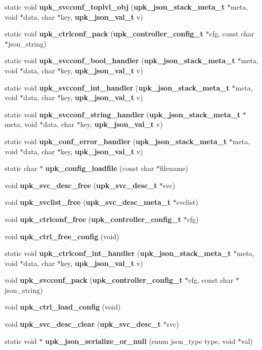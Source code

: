 \begin{DoxyCompactItemize}
\item 
static void {\bf upk\_\-svcconf\_\-toplvl\_\-obj} ({\bf upk\_\-json\_\-stack\_\-meta\_\-t} $\ast$meta, void $\ast$data, char $\ast$key, {\bf upk\_\-json\_\-val\_\-t} v)
\item 
static void {\bf upk\_\-ctrlconf\_\-pack} ({\bf upk\_\-controller\_\-config\_\-t} $\ast$cfg, const char $\ast$json\_\-string)
\item 
static void {\bf upk\_\-svcconf\_\-bool\_\-handler} ({\bf upk\_\-json\_\-stack\_\-meta\_\-t} $\ast$meta, void $\ast$data, char $\ast$key, {\bf upk\_\-json\_\-val\_\-t} v)
\item 
static void {\bf upk\_\-svcconf\_\-int\_\-handler} ({\bf upk\_\-json\_\-stack\_\-meta\_\-t} $\ast$meta, void $\ast$data, char $\ast$key, {\bf upk\_\-json\_\-val\_\-t} v)
\item 
static void {\bf upk\_\-svcconf\_\-string\_\-handler} ({\bf upk\_\-json\_\-stack\_\-meta\_\-t} $\ast$meta, void $\ast$data, char $\ast$key, {\bf upk\_\-json\_\-val\_\-t} v)
\item 
static void {\bf upk\_\-conf\_\-error\_\-handler} ({\bf upk\_\-json\_\-stack\_\-meta\_\-t} $\ast$meta, void $\ast$data, char $\ast$key, {\bf upk\_\-json\_\-val\_\-t} v)
\item 
static char $\ast$ {\bf upk\_\-config\_\-loadfile} (const char $\ast$filename)
\item 
void {\bf upk\_\-svc\_\-desc\_\-free} ({\bf upk\_\-svc\_\-desc\_\-t} $\ast$svc)
\item 
void {\bf upk\_\-svclist\_\-free} ({\bf upk\_\-svc\_\-desc\_\-meta\_\-t} $\ast$svclist)
\item 
void {\bf upk\_\-ctrlconf\_\-free} ({\bf upk\_\-controller\_\-config\_\-t} $\ast$cfg)
\item 
void {\bf upk\_\-ctrl\_\-free\_\-config} (void)
\item 
static void {\bf upk\_\-ctrlconf\_\-int\_\-handler} ({\bf upk\_\-json\_\-stack\_\-meta\_\-t} $\ast$meta, void $\ast$data, char $\ast$key, {\bf upk\_\-json\_\-val\_\-t} v)
\item 
void {\bf upk\_\-svcconf\_\-pack} ({\bf upk\_\-controller\_\-config\_\-t} $\ast$cfg, const char $\ast$json\_\-string)
\item 
void {\bf upk\_\-ctrl\_\-load\_\-config} (void)
\item 
void {\bf upk\_\-svc\_\-desc\_\-clear} ({\bf upk\_\-svc\_\-desc\_\-t} $\ast$svc)
\item 
static void $\ast$ {\bf upk\_\-json\_\-serialize\_\-or\_\-null} (enum json\_\-type type, void $\ast$val)

\end{DoxyCompactItemize}
